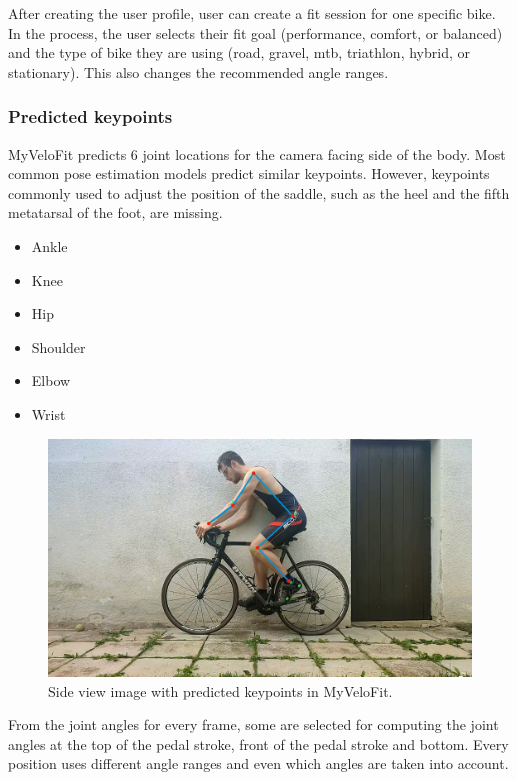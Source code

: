 After creating the user profile, user can create a fit session for one specific bike. In the process, the user selects their fit goal (performance, comfort, or balanced) and the type of bike they are using (road, gravel, mtb, triathlon, hybrid, or stationary). This also changes the recommended angle ranges.

\subsubsection{Predicted keypoints}
MyVeloFit predicts 6 joint locations for the camera facing side of the body. Most common pose estimation models predict similar keypoints. However, keypoints commonly used to adjust the position of the saddle, such as the heel and the fifth metatarsal of the foot, are missing.


\begin{itemize}
    \item Ankle
    \item Knee
    \item Hip
    \item Shoulder
    \item Elbow
    \item Wrist
\end{itemize}

\begin{figure}[htbp]
    \centering
    \includegraphics[width=\textwidth]{obrazky-figures/myvelofit_keypoints.png}
    \caption{Side view image with predicted keypoints in MyVeloFit.}
    \label{fig:myvelofit_keypoints}
\end{figure}

From the joint angles for every frame, some are selected for computing the joint angles at the top of the pedal stroke, front of the pedal stroke and bottom. Every position uses different angle ranges and even which angles are taken into account.

